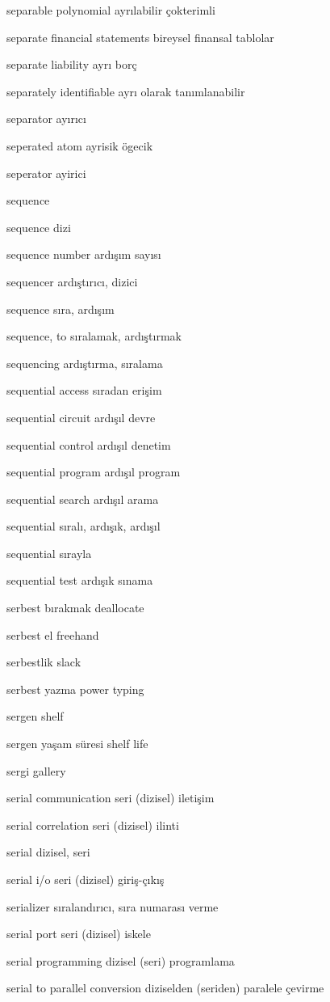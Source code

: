 \documentclass[12pt,fleqn]{article}\usepackage{../../common}
\begin{document}
separable polynomial ayrılabilir çokterimli

separate financial statements bireysel finansal tablolar

separate liability ayrı borç

separately identifiable ayrı olarak tanımlanabilir

separator ayırıcı

seperated atom ayrisik ögecik

seperator ayirici

sequence

sequence dizi

sequence number ardışım sayısı

sequencer ardıştırıcı, dizici

sequence sıra, ardışım

sequence, to sıralamak, ardıştırmak

sequencing ardıştırma, sıralama

sequential access sıradan erişim

sequential circuit ardışıl devre

sequential control ardışıl denetim

sequential program ardışıl program

sequential search ardışıl arama

sequential sıralı, ardışık, ardışıl

sequential sırayla

sequential test ardışık sınama

serbest bırakmak deallocate

serbest el freehand

serbestlik slack

serbest yazma power typing

sergen shelf

sergen yaşam süresi shelf life

sergi gallery

serial communication seri (dizisel) iletişim

serial correlation seri (dizisel) ilinti

serial dizisel, seri

serial i/o seri (dizisel) giriş-çıkış

serializer sıralandırıcı, sıra numarası verme

serial port seri (dizisel) iskele

serial programming dizisel (seri) programlama

serial to parallel conversion diziselden (seriden) paralele çevirme
\end{document}
